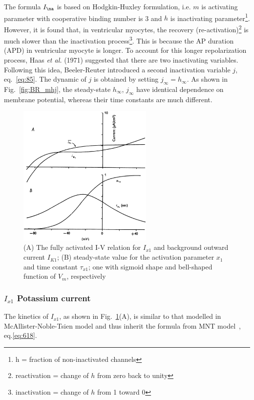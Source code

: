 The formula $I_\na$ is based on Hodgkin-Huxley formulation, i.e. $m$ is
activating parameter with cooperative binding number is 3 and $h$ is
inactivating parameter\footnote{h = fraction of non-inactivated channels}.
However, it is found that, in ventricular myocytes, the recovery
(re-activation)\footnote{reactivation = change of $h$ from zero back to
  unity} is much slower than the inactivation
process\footnote{inactivation = change of $h$ from 1 toward 0}. This is because
the AP duration (APD) in ventricular myocyte is longer. To account for this
longer repolarization process, Haas {\it et al.} (1971) suggested that there are
two inactivating variables. Following this idea, Beeler-Reuter introduced a second
inactivation variable $j$, eq.~\eqref{eq:85}. The dynamic of $j$ is obtained by
setting $j_\infty=h_\infty$. As shown in Fig.~\ref{fig:BR_mhj}, the steady-state
$h_\infty$, $j_\infty$ have identical dependence on membrane potential, whereas
their time constants are much different. %

\begin{figure}[hbt]
  \centerline{\includegraphics[height=7cm,
    angle=0]{./images/BR_ix1.eps}}
  \caption{(A) The fully activated I-V relation for $I_{x1}$ and
    background outward current $I_{K1}$; (B) steady-state value for
    the activation parameter $x_1$ and time constant $\tau_{x1}$; one
    with sigmoid shape and bell-shaped function of $V_m$, respectively}
  \label{fig:BR_ix1}
\end{figure}

\subsubsection{$I_{x1}$ Potassium current}

The kinetics of $I_{x1}$, as shown in Fig.~\ref{fig:BR_ix1}(A), is
similar to that modelled in McAllister-Noble-Tsien model and thus
inherit the formula from MNT model~\citep{mcallister1975rea}, eq.\ref{eq:618}.  

